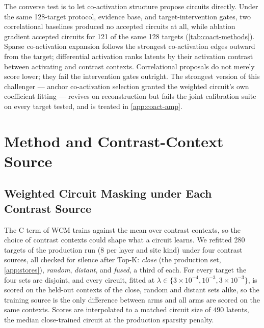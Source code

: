 \documentclass[10pt]{article}
\begin{document}
The converse test is to let co-activation structure propose circuits directly.
Under the same 128-target protocol, evidence base, and target-intervention gates, two correlational baselines produced no accepted circuits at all, while ablation gradient accepted circuits for 121 of the same 128 targets (\cref{tab:coact-methods}).
Sparse co-activation expansion follows the strongest co-activation edges outward from the target; differential activation ranks latents by their activation contrast between activating and contrast contexts.
Correlational proposals do not merely score lower; they fail the intervention gates outright.
The strongest version of this challenger --- anchor co-activation selection granted the weighted circuit's own coefficient fitting --- revives on reconstruction but fails the joint calibration suite on every target tested, and is treated in \cref{app:coact-amp}.

\FloatBarrier   %
\section{Method and Contrast-Context Source}
\label{app:contrast-source}

\subsection{Weighted Circuit Masking under Each Contrast Source}
\label{app:contrast-source-v1}
The C term of WCM trains against the mean over contrast contexts, so the choice of contrast contexts could shape what a circuit learns.
We refitted 280 targets of the production run (8 per layer and site kind) under four contrast sources, all checked for silence after Top-K: \emph{close} (the production set, \cref{app:stores}), \emph{random}, \emph{distant}, and \emph{fused}, a third of each.
For every target the four sets are disjoint, and every circuit, fitted at $\lambda \in \{3 \times 10^{-4}, 10^{-3}, 3 \times 10^{-3}\}$, is scored on the held-out contexts of the close, random and distant sets alike, so the training source is the only difference between arms and all arms are scored on the same contexts.
Scores are interpolated to a matched circuit size of $490$ latents, the median close-trained circuit at the production sparsity penalty.
\end{document}
